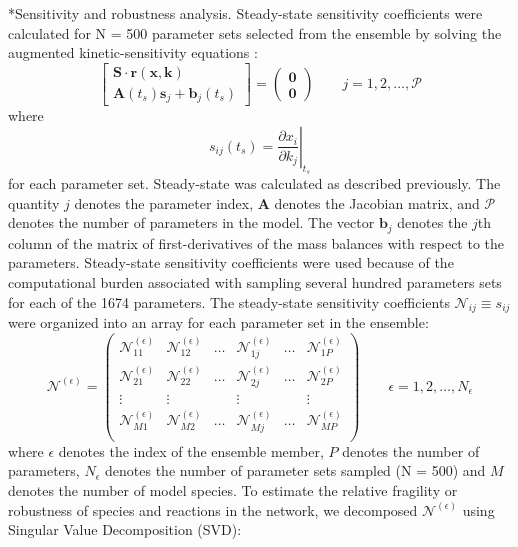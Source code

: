 \documentclass[12pt]{article}
\makeatletter
\renewcommand\subsection{\@startsection
	{subsection}{2}{0mm}
	{-0.05in}
	{-0.5\baselineskip}
	{\normalfont\normalsize\bfseries}}
\makeatother
\begin{document}
\subsection*{Sensitivity and robustness analysis.}
Steady-state sensitivity coefficients were calculated for N = 500 parameter sets selected from the ensemble by solving the augmented kinetic-sensitivity equations \cite{Dickinson1976}:
\begin{equation}
	\begin{bmatrix}
		\mathbf{S}\cdot\mathbf{r}(\mathbf{x},\mathbf{k}) \\
		\mathbf{A}(t_s)\mathbf{s}_j + \mathbf{b}_j(t_s)
	\end{bmatrix} = \begin{pmatrix}
		\mathbf{0} \\
		\mathbf{0}
	\end{pmatrix}
	   \qquad j = 1,2,\dots,\mathcal{P}
\end{equation}
where
\begin{equation}
s_{ij}(t_s)= \left. \frac{\partial{x_i}}{\partial{k_j}} \right|_{t_s}
\end{equation} for each parameter set.
Steady-state was calculated as described previously.
The quantity $j$ denotes the parameter index, $\mathbf{A}$ denotes the Jacobian matrix, and $\mathcal{P}$ denotes the number of parameters in the model. 
The vector $\mathbf{b}_j$ denotes the $j$th column of the matrix of first-derivatives of the mass balances with respect to the parameters. 
Steady-state sensitivity coefficients were used because of the computational burden associated with sampling several hundred parameters sets for each of the 1674 parameters. 
The steady-state sensitivity coefficients $\mathcal{N}_{ij} \equiv s_{ij}$ were organized into an array for each parameter set in the ensemble: 
\begin{equation}
	\mathcal{N}^{\left(\epsilon\right)} = 
	\begin{pmatrix}
		\mathcal{N}_{11}^{\left(\epsilon\right)} & \mathcal{N}_{12}^{\left(\epsilon\right)} & \hdots & \mathcal{N}_{1j}^{\left(\epsilon\right)} & \hdots & \mathcal{N}_{1P}^{\left(\epsilon\right)} \\
		\mathcal{N}_{21}^{\left(\epsilon\right)} & \mathcal{N}_{22}^{\left(\epsilon\right)} & \hdots & \mathcal{N}_{2j}^{\left(\epsilon\right)} & \hdots & \mathcal{N}_{2P}^{\left(\epsilon\right)} \\
		\vdots & \vdots & & \vdots & & \vdots \\
		\mathcal{N}_{M1}^{\left(\epsilon\right)} & \mathcal{N}_{M2}^{\left(\epsilon\right)} & \hdots & \mathcal{N}_{Mj}^{\left(\epsilon\right)} & \hdots & \mathcal{N}_{MP}^{\left(\epsilon\right)} \\
	\end{pmatrix}\qquad\epsilon = 1,2,\hdots,N_{\epsilon}
\end{equation}
where $\epsilon$ denotes the index of the ensemble member, $P$ denotes the number of parameters, $N_{\epsilon}$ denotes the number of parameter sets sampled (N = 500) and $M$ denotes the number of model species. 
To estimate the relative fragility or robustness of species and reactions in the network, we decomposed $\mathcal{N}^{\left(\epsilon\right)}$ 
using Singular Value Decomposition (SVD):
\end{document}
